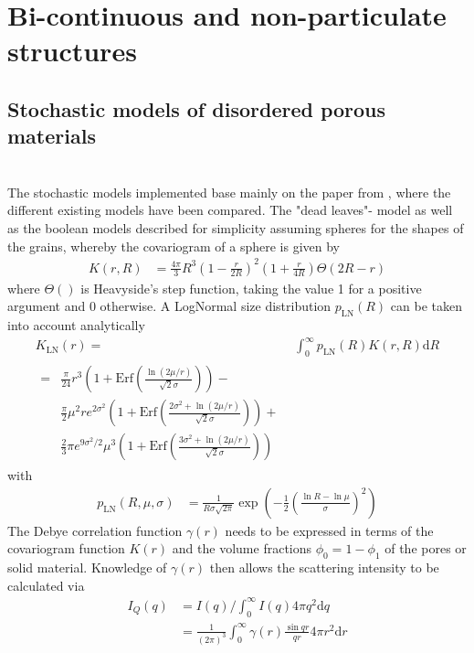 \section{Bi-continuous and non-particulate structures}

\subsection{Stochastic models of disordered porous materials}~\\

The stochastic models implemented base mainly on the paper from \cite{Gommes2018}, where the different existing models have been  compared. The "dead leaves"- model as well as the boolean models described for simplicity assuming spheres for the shapes of the grains, whereby the covariogram of a sphere is given by
\begin{align}\label{eq:covariogram_sphere}
K(r,R) &= \frac{4\pi}{3}R^3\left(1-\frac{r}{2R}\right)^2\left(1+\frac{r}{4R}\right)\Theta(2R-r)
\end{align}
where $\Theta()$ is Heavyside's step function, taking the value 1 for a positive argument and 0 otherwise. A LogNormal size distribution $p_\mathrm{LN}(R)$ can be taken into account analytically
\begin{align}
  K_\mathrm{LN}(r) =& \int_0^\infty  p_\mathrm{LN}(R) K(r,R) \mathrm{d}R \nonumber\\
       \begin{split}
            =& \frac{\pi}{24} r^3 \left(1+\mathrm{Erf}\left(\frac{\ln(2\mu/r)}{\sqrt{2}\sigma}\right)\right) -\\
            & \frac{\pi}{2}\mu^2r e^{2\sigma^2} \left(1+\mathrm{Erf}\left(\frac{2\sigma^2+\ln(2\mu/r)}{\sqrt{2}\sigma}\right)\right) +\\
            & \frac23 \pi e^{9\sigma^2/2}\mu^3\left(1+\mathrm{Erf}\left(\frac{3\sigma^2+\ln(2\mu/r)}{\sqrt{2}\sigma}\right)\right)
       \end{split} \label{eq:covariogram_sphere_LogNorm}
\end{align}
with
\begin{align}
  p_\mathrm{LN}(R,\mu,\sigma) &=  \frac{1}{R\sigma \sqrt{2 \pi}}\exp\left(-\frac{1}{2}\left(\frac{\ln R -
        \ln\mu}{\sigma}\right)^2\right)
\end{align}
The Debye correlation function $\gamma(r)$ needs to be expressed in terms of the covariogram function $K(r)$ and the volume fractions $\phi_0=1-\phi_1$ of the pores or solid material. Knowledge of $\gamma(r)$ then allows the scattering intensity to be calculated via
\begin{align}
  I_Q(q) &= I(q)/\int_0^\infty I(q) 4\pi q^2 \mathrm{d}q \\
         &= \frac{1}{(2\pi)^3} \int_0^\infty \gamma(r) \frac{\sin qr}{qr}4\pi r^2\mathrm{d}r
\end{align}

